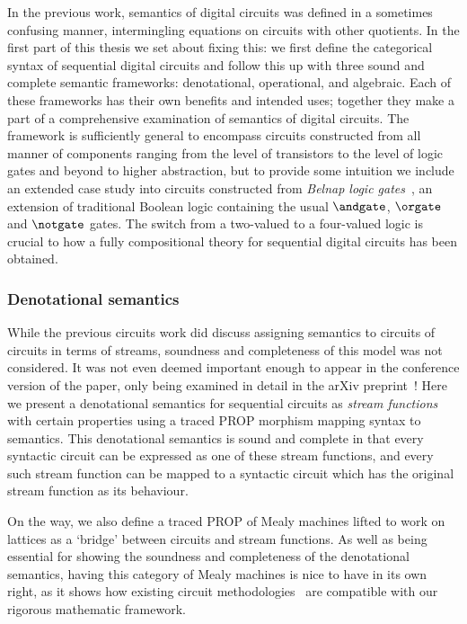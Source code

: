 In the previous work, semantics of digital circuits was defined in a sometimes
confusing manner, intermingling equations on circuits with other quotients.
In the first part of this thesis we set about fixing this: we first define the
categorical syntax of sequential digital circuits and follow this up with three
sound and complete semantic frameworks: denotational, operational, and
algebraic.
Each of these frameworks has their own benefits and intended uses; together they
make a part of a comprehensive examination of semantics of digital circuits.
The framework is sufficiently general to encompass circuits constructed from
all manner of components ranging from the level of transistors to the level of
logic gates and beyond to higher abstraction, but to provide some intuition we
include an extended case study into circuits constructed from
\emph{Belnap logic gates}~\cite{belnap1977useful}, an extension of traditional
Boolean logic containing the usual \(\andgate\), \(\orgate\) and \(\notgate\)
gates.
The switch from a two-valued to a four-valued logic is crucial to how a fully
compositional theory for sequential digital circuits has been obtained.

\subsubsection{Denotational semantics}

While the previous circuits work did discuss assigning semantics to circuits
of circuits in terms of streams, soundness and completeness of this model was
not considered.
It was not even deemed important enough to appear in the conference version of
the paper, only being examined in detail in the arXiv
preprint~\cite{ghica2017diagrammatica}!
Here we present a denotational semantics for sequential circuits as
\emph{stream functions} with certain properties using a traced PROP morphism
mapping syntax to semantics.
This denotational semantics is sound and complete in that every syntactic
circuit can be expressed as one of these stream functions, and every such stream
function can be mapped to a syntactic circuit which has the original stream
function as its behaviour.

On the way, we also define a traced PROP of Mealy machines lifted to work on
lattices as a `bridge' between circuits and stream functions.
As well as being essential for showing the soundness and completeness of the
denotational semantics, having this category of Mealy machines is nice to have
in its own right, as it shows how existing circuit
methodologies~\cite{kohavi2009switching} are compatible with our rigorous
mathematic framework.

